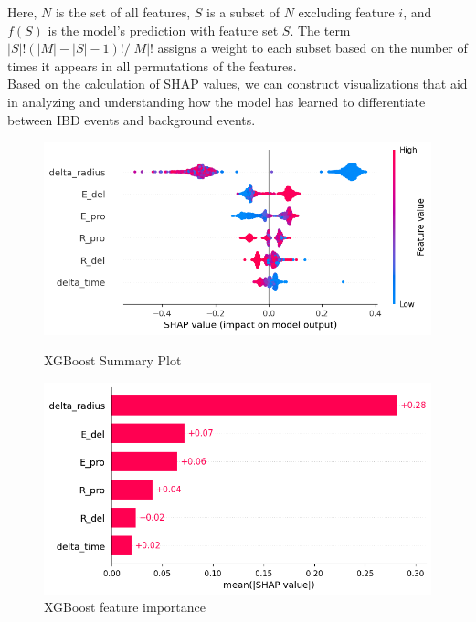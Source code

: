 Here, \(N\) is the set of all features, \(S\) is a subset of \(N\) excluding feature \(i\), and \(f(S)\) is the model's prediction with feature set \(S\). The term \(|S|!(|M| - |S| - 1)! / |M|!\) assigns a weight to each subset based on the number of times it appears in all permutations of the features.\\



Based on the calculation of SHAP values, we can construct visualizations that aid in analyzing and understanding how the model has learned to differentiate between IBD events and background events. 

\begin{figure}[h!]
	\centering
	\begin{minipage}{0.5\textwidth}
		\centering
		\includegraphics[width=\linewidth]{Images/Shap/summary_plot}
		\caption{XGBoost Summary Plot}
		\label{fig:summary_plot}
	\end{minipage}%
	\begin{minipage}{0.5\textwidth}
		\centering
		\includegraphics[width=\linewidth]{Images/Shap/feature_importance_bar}
		\caption{XGBoost feature importance}
		\label{fig:feature_importance}
	\end{minipage}
\end{figure}


